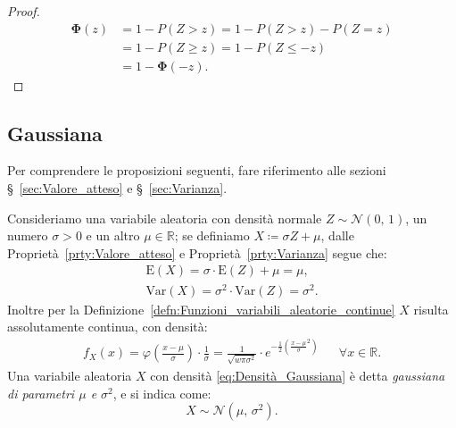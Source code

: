             \begin{proof}
                \hfill
                \begin{align*}
                    \mathbf{\Phi}(z) &= 1 - P(Z > z) = 1 - P(Z > z) - P(Z = z) \\
                                     &= 1 - P(Z \geq z) = 1 - P(Z \leq -z) \\
                                     &= 1 - \mathbf{\Phi}(-z)
                .\end{align*}
            \end{proof}
        \subsection{Gaussiana}
            \begin{note}
                Per comprendere le proposizioni seguenti, fare riferimento alle sezioni §~\ref{sec:Valore_atteso} e §~\ref{sec:Varianza}.
            \end{note}
            \begin{defn}\label{defn:Gaussiana}
                Consideriamo una variabile aleatoria con densità normale $Z \sim \mathcal{N}(0,\,1)$, un numero $\sigma > 0$ e un altro $\mu \in \mathbb{R}$; se definiamo $X \coloneqq \sigma Z + \mu$, dalle Proprietà~\ref{prty:Valore_atteso} e Proprietà~\ref{prty:Varianza} segue che:
                \begin{gather*}
                    \text{E}(X) = \sigma \cdot \text{E}(Z) + \mu = \mu, \\
                    \text{Var}(X) = \sigma^2 \cdot \text{Var}(Z) = \sigma^2
                .\end{gather*}
                Inoltre per la Definizione~\ref{defn:Funzioni_variabili_aleatorie_continue} $X$ risulta assolutamente continua, con densità:
                \begin{align}\label{eq:Densità_Gaussiana}
                    f_X(x) = \varphi \left(\frac{x-\mu}{\sigma}\right)\cdot \frac{1}{\sigma} = \frac{1}{\sqrt{w\pi\sigma^2}} \cdot e^{-\frac{1}{2}\left(\frac{x-\mu}{\sigma}^2\right)} & & \forall x \in \mathbb{R}
                .\end{align}
                Una variabile aleatoria $X$ con densità \eqref{eq:Densità_Gaussiana} è detta \textit{gaussiana di parametri $\mu$ e $\sigma^2$}, e si indica come: \[
                    X \sim \mathcal{N}(\mu,\,\sigma^2)
                .\] 
            \end{defn}
